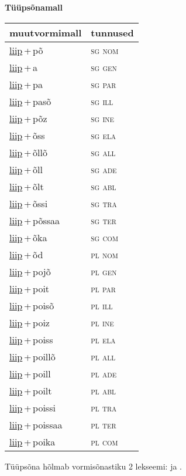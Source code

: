 
\vspace{1.8em}
\begin{minipage}{\textwidth}
\textbf{Tüüpsõnamall \,}\\

\begin{sideways}
\begin{tabular}{l l}
muutvormimall & tunnused \\
\hline
\underline{liip}\,+\,põ & \textsc{ sg nom } \\
\underline{liip}\,+\,a & \textsc{ sg gen } \\
\underline{liip}\,+\,pa & \textsc{ sg par } \\
\underline{liip}\,+\,pasõ & \textsc{ sg ill } \\
\underline{liip}\,+\,põz & \textsc{ sg ine } \\
\underline{liip}\,+\,õss & \textsc{ sg ela } \\
\underline{liip}\,+\,õllõ & \textsc{ sg all } \\
\underline{liip}\,+\,õll & \textsc{ sg ade } \\
\underline{liip}\,+\,õlt & \textsc{ sg abl } \\
\underline{liip}\,+\,õssi & \textsc{ sg tra } \\
\underline{liip}\,+\,põssaa & \textsc{ sg ter } \\
\underline{liip}\,+\,õka & \textsc{ sg com } \\
\underline{liip}\,+\,õd & \textsc{ pl nom } \\
\underline{liip}\,+\,pojõ & \textsc{ pl gen } \\
\underline{liip}\,+\,poit & \textsc{ pl par } \\
\underline{liip}\,+\,poisõ & \textsc{ pl ill } \\
\underline{liip}\,+\,poiz & \textsc{ pl ine } \\
\underline{liip}\,+\,poiss & \textsc{ pl ela } \\
\underline{liip}\,+\,poillõ & \textsc{ pl all } \\
\underline{liip}\,+\,poill & \textsc{ pl ade } \\
\underline{liip}\,+\,poilt & \textsc{ pl abl } \\
\underline{liip}\,+\,poissi & \textsc{ pl tra } \\
\underline{liip}\,+\,poissaa & \textsc{ pl ter } \\
\underline{liip}\,+\,poika & \textsc{ pl com } \\
\end{tabular}
\end{sideways}
\label{tab:tüüpsõnamall-liippõ}

\end{minipage}

 
\vspace{1em}
\noindent Tüüpsõna hõlmab vormisõnastiku 2 lekseemi:  ja .
